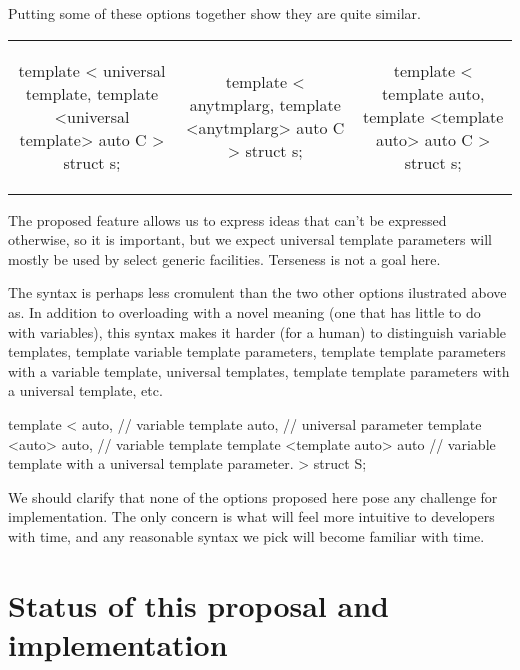 \documentclass{wg21}
\begin{document}
Putting some of these options together show they are quite similar.

\begin{table}
\tiny
\hspace{-30pt}
\begin{tabular}{c | c | c}
\begin{colorblock}
template <
  universal template,
  template <universal template> auto C
>
struct s;
\end{colorblock}
&
\begin{colorblock}
template <
  anytmplarg,
  template <anytmplarg> auto C
>
struct s;
\end{colorblock}
&
\begin{colorblock}
template <
  template auto,
  template <template auto> auto C
>
struct s;
\end{colorblock}
\end{tabular}
\end{table}


The proposed feature allows us to express ideas that can't be expressed otherwise, so it is important,
but we expect universal template parameters will mostly be used by select generic facilities. Terseness is not a goal here.

The  syntax is perhaps less cromulent than the two other options ilustrated above as. In addition to overloading
 with a novel meaning (one that has little to do with variables), this syntax makes it harder (for a human) to distinguish
variable templates, template variable template parameters, template template parameters with a variable template, universal templates,
template template parameters with a universal template, etc.

\begin{colorblock}
template <
   auto, // variable
   template auto, // universal parameter
   template <auto> auto, // variable template
   template <template auto> auto // variable template with a universal template parameter.
>
struct S;
\end{colorblock}


We should clarify that none of the options proposed here pose any challenge for implementation. The only concern is what will feel more intuitive to
developers with time, and any reasonable syntax we pick will become familiar with time.


\section{Status of this proposal and implementation}
\end{document}
